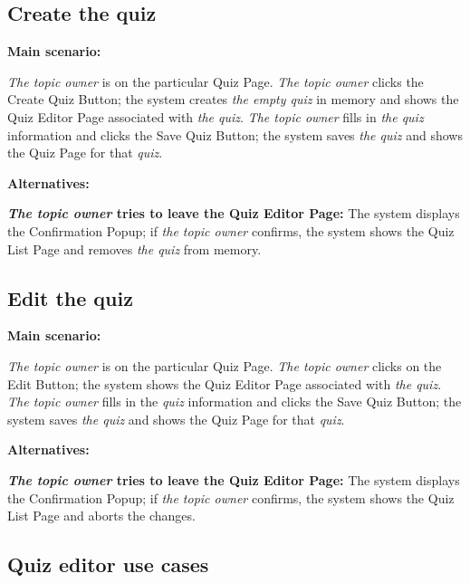 \documentclass[
    english, %
]{VUMIFPSkursinis}
\begin{document}
\subsection{Create the quiz}

\noindent\textbf{\fontsize{13}{15}\selectfont Main scenario:}

\textit{The topic owner} is on the particular Quiz Page. \textit{The topic owner} clicks the Create Quiz Button; the system creates \textit{the empty quiz} in memory and shows the Quiz Editor Page associated with \textit{the quiz}. \textit{The topic owner} fills in \textit{the quiz} information and clicks the Save Quiz Button; the system saves \textit{the quiz} and shows the Quiz Page for that \textit{quiz}.

\noindent\textbf{\fontsize{13}{15}\selectfont Alternatives:}

\textbf{\textit{The topic owner} tries to leave the Quiz Editor Page:} The system displays the Confirmation Popup; if \textit{the topic owner} confirms, the system shows the Quiz List Page and removes \textit{the quiz} from memory.

\subsection{Edit the quiz}

\noindent\textbf{\fontsize{13}{15}\selectfont Main scenario:}

\textit{The topic owner} is on the particular Quiz Page. \textit{The topic owner} clicks on the Edit Button; the system shows the Quiz Editor Page associated with \textit{the quiz}. \textit{The topic owner} fills in the \textit{quiz} information and clicks the Save Quiz Button; the system saves \textit{the quiz} and shows the Quiz Page for that \textit{quiz}.

\noindent\textbf{\fontsize{13}{15}\selectfont Alternatives:}

\textbf{\textit{The topic owner} tries to leave the Quiz Editor Page:} The system displays the Confirmation Popup; if \textit{the topic owner} confirms, the system shows the Quiz List Page and aborts the changes.

\subsection{Quiz editor use cases}

\pagebreak
\end{document}

